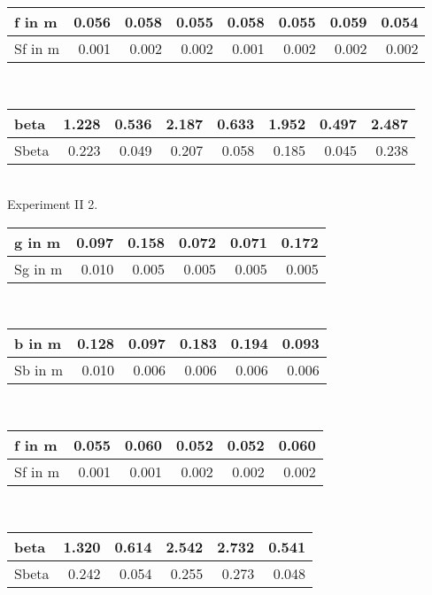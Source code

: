 	\bigskip\normalsize
	\begin{tabular}{| l | r|r|r|r|r|r|r|}
	\hline
        f in m& 0.056 & 0.058 & 0.055 & 0.058 & 0.055 & 0.059 & 0.054 \\ \hline Sf in m& 0.001 & 0.002 & 0.002 & 0.001 & 0.002 & 0.002 & 0.002 \\ \hline
	\end{tabular} \\ \bigskip
	\bigskip\normalsize
	\begin{tabular}{| l | r|r|r|r|r|r|r|}
	\hline
        beta& 1.228 & 0.536 & 2.187 & 0.633 & 1.952 & 0.497 & 2.487 \\ \hline Sbeta& 0.223 & 0.049 & 0.207 & 0.058 & 0.185 & 0.045 & 0.238 \\ \hline
	\end{tabular} \\ \bigskip
	Experiment II 2. \\ \bigskip\normalsize
	\begin{tabular}{| l | r|r|r|r|r|}
	\hline
        g in m& 0.097 & 0.158 & 0.072 & 0.071 & 0.172 \\ \hline Sg in m& 0.010 & 0.005 & 0.005 & 0.005 & 0.005 \\ \hline
	\end{tabular} \\ \bigskip
	\bigskip\normalsize
	\begin{tabular}{| l | r|r|r|r|r|}
	\hline
        b in m& 0.128 & 0.097 & 0.183 & 0.194 & 0.093 \\ \hline Sb in m& 0.010 & 0.006 & 0.006 & 0.006 & 0.006 \\ \hline
	\end{tabular} \\ \bigskip
	\bigskip\normalsize
	\begin{tabular}{| l | r|r|r|r|r|}
	\hline
        f in m& 0.055 & 0.060 & 0.052 & 0.052 & 0.060 \\ \hline Sf in m& 0.001 & 0.001 & 0.002 & 0.002 & 0.002 \\ \hline
	\end{tabular} \\ \bigskip
	\bigskip\normalsize
	\begin{tabular}{| l | r|r|r|r|r|}
	\hline
        beta& 1.320 & 0.614 & 2.542 & 2.732 & 0.541 \\ \hline Sbeta& 0.242 & 0.054 & 0.255 & 0.273 & 0.048 \\ \hline
	\end{tabular} \\ \bigskip
	